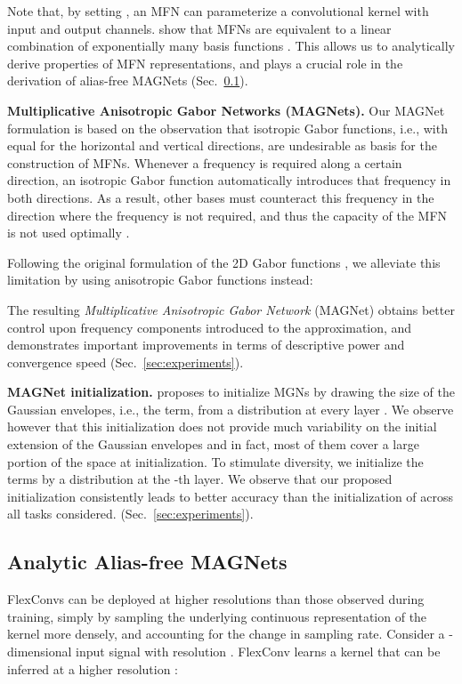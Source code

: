 \documentclass{article} \usepackage{iclr2022_conference,times}
\begin{document}
Note that, by setting , an MFN can parameterize a convolutional kernel with  input and  output channels.
\citet{fathony2021multiplicative} show that MFNs are equivalent to a linear combination of exponentially many basis functions . This allows us to analytically derive properties of MFN representations, and plays a crucial role in the derivation of alias-free MAGNets (Sec.~\ref{sec:crtraining}).

\textbf{Multiplicative Anisotropic Gabor Networks (MAGNets).} Our MAGNet formulation is based on the observation that isotropic Gabor functions, i.e., with equal  for the horizontal and vertical directions, are undesirable as basis for the construction of MFNs. Whenever a frequency is required along a certain direction, an isotropic Gabor function automatically introduces that frequency in both directions. As a result, other bases must counteract this frequency in the direction where the frequency is not required, and thus the capacity of the MFN is not used optimally \citep{daugman1988complete}. 

Following the original formulation of the 2D Gabor functions \citep{daugman1988complete}, we alleviate this limitation by using anisotropic Gabor functions instead:\vspace{-0.5mm}

\vspace{-5.5mm}

The resulting \textit{Multiplicative Anisotropic Gabor Network} (MAGNet) obtains better control upon frequency components introduced to the approximation, and demonstrates important improvements in terms of descriptive power and convergence speed (Sec.~\ref{sec:experiments}).

\textbf{MAGNet initialization.} \citet{fathony2021multiplicative} proposes to initialize MGNs by drawing the size of the Gaussian envelopes, i.e., the  term, from a  distribution at every layer . We observe however that this initialization does not provide much variability on the initial extension of the Gaussian envelopes and in fact, most of them cover a large portion of the space at initialization.
To stimulate diversity, we initialize the  terms by a  distribution at the -th layer. We observe that our proposed initialization consistently leads to better accuracy than the initialization of \cite{fathony2021multiplicative} across all tasks considered. (Sec.~\ref{sec:experiments}).
\vspace{-1mm}
\subsection{Analytic Alias-free MAGNets}
\label{sec:crtraining}
\vspace{-1mm}
FlexConvs can be deployed at higher resolutions than those observed during training, simply by sampling the underlying continuous representation of the kernel more densely, and accounting for the change in sampling rate. Consider a -dimensional input signal  with resolution . FlexConv learns a kernel  that can be inferred at a higher resolution  \citep{romero2021ckconv}:  
\end{document}
